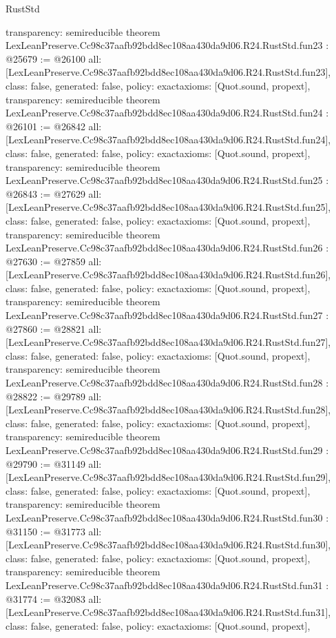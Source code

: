 \begin{lexlean}{RustStd}
\begin{coremodule}
{  transparency: semireducible
}
theorem LexLeanPreserve.Cc98c37aafb92bdd8ec108aa430da9d06.R24.RustStd.fun23 : @25679 := @26100 {
  all: [LexLeanPreserve.Cc98c37aafb92bdd8ec108aa430da9d06.R24.RustStd.fun23],
  class: false,
  generated: false,
  policy: exact{axioms: [Quot.sound, propext]},
  transparency: semireducible
}
theorem LexLeanPreserve.Cc98c37aafb92bdd8ec108aa430da9d06.R24.RustStd.fun24 : @26101 := @26842 {
  all: [LexLeanPreserve.Cc98c37aafb92bdd8ec108aa430da9d06.R24.RustStd.fun24],
  class: false,
  generated: false,
  policy: exact{axioms: [Quot.sound, propext]},
  transparency: semireducible
}
theorem LexLeanPreserve.Cc98c37aafb92bdd8ec108aa430da9d06.R24.RustStd.fun25 : @26843 := @27629 {
  all: [LexLeanPreserve.Cc98c37aafb92bdd8ec108aa430da9d06.R24.RustStd.fun25],
  class: false,
  generated: false,
  policy: exact{axioms: [Quot.sound, propext]},
  transparency: semireducible
}
theorem LexLeanPreserve.Cc98c37aafb92bdd8ec108aa430da9d06.R24.RustStd.fun26 : @27630 := @27859 {
  all: [LexLeanPreserve.Cc98c37aafb92bdd8ec108aa430da9d06.R24.RustStd.fun26],
  class: false,
  generated: false,
  policy: exact{axioms: [Quot.sound, propext]},
  transparency: semireducible
}
theorem LexLeanPreserve.Cc98c37aafb92bdd8ec108aa430da9d06.R24.RustStd.fun27 : @27860 := @28821 {
  all: [LexLeanPreserve.Cc98c37aafb92bdd8ec108aa430da9d06.R24.RustStd.fun27],
  class: false,
  generated: false,
  policy: exact{axioms: [Quot.sound, propext]},
  transparency: semireducible
}
theorem LexLeanPreserve.Cc98c37aafb92bdd8ec108aa430da9d06.R24.RustStd.fun28 : @28822 := @29789 {
  all: [LexLeanPreserve.Cc98c37aafb92bdd8ec108aa430da9d06.R24.RustStd.fun28],
  class: false,
  generated: false,
  policy: exact{axioms: [Quot.sound, propext]},
  transparency: semireducible
}
theorem LexLeanPreserve.Cc98c37aafb92bdd8ec108aa430da9d06.R24.RustStd.fun29 : @29790 := @31149 {
  all: [LexLeanPreserve.Cc98c37aafb92bdd8ec108aa430da9d06.R24.RustStd.fun29],
  class: false,
  generated: false,
  policy: exact{axioms: [Quot.sound, propext]},
  transparency: semireducible
}
theorem LexLeanPreserve.Cc98c37aafb92bdd8ec108aa430da9d06.R24.RustStd.fun30 : @31150 := @31773 {
  all: [LexLeanPreserve.Cc98c37aafb92bdd8ec108aa430da9d06.R24.RustStd.fun30],
  class: false,
  generated: false,
  policy: exact{axioms: [Quot.sound, propext]},
  transparency: semireducible
}
theorem LexLeanPreserve.Cc98c37aafb92bdd8ec108aa430da9d06.R24.RustStd.fun31 : @31774 := @32083 {
  all: [LexLeanPreserve.Cc98c37aafb92bdd8ec108aa430da9d06.R24.RustStd.fun31],
  class: false,
  generated: false,
  policy: exact{axioms: [Quot.sound, propext]},
}
\end{coremodule}
\end{lexlean}
